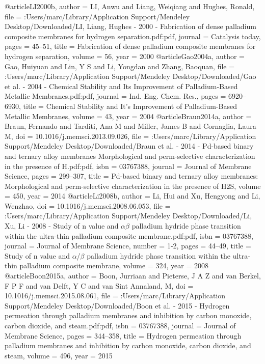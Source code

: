 @article{LI2000b,
author = {LI, Anwu and Liang, Weiqiang and Hughes, Ronald},
file = {:Users/marc/Library/Application Support/Mendeley Desktop/Downloaded/LI, Liang, Hughes - 2000 - Fabrication of dense palladium composite membranes for hydrogen separation.pdf:pdf},
journal = {Catalysis today},
pages = {45--51},
title = {{Fabrication of dense palladium composite membranes for hydrogen separation}},
volume = {56},
year = {2000}
}
@article{Gao2004a,
author = {Gao, Huiyuan and Lin, Y S and Li, Yongdan and Zhang, Baoquan},
file = {:Users/marc/Library/Application Support/Mendeley Desktop/Downloaded/Gao et al. - 2004 - Chemical Stability and Its Improvement of Palladium-Based Metallic Membranes.pdf:pdf},
journal = {Ind. Eng. Chem. Res.},
pages = {6920--6930},
title = {{Chemical Stability and It's Improvement of Palladium-Based Metallic Membranes}},
volume = {43},
year = {2004}
}
@article{Braun2014a,
author = {Braun, Fernando and Tarditi, Ana M and Miller, James B and Cornaglia, Laura M},
doi = {10.1016/j.memsci.2013.09.026},
file = {:Users/marc/Library/Application Support/Mendeley Desktop/Downloaded/Braun et al. - 2014 - Pd-based binary and ternary alloy membranes Morphological and perm-selective characterization in the presence of H.pdf:pdf},
isbn = {03767388},
journal = {Journal of Membrane Science},
pages = {299--307},
title = {{Pd-based binary and ternary alloy membranes: Morphological and perm-selective characterization in the presence of H2S}},
volume = {450},
year = {2014}
}
@article{Li2008b,
author = {Li, Hui and Xu, Hengyong and Li, Wenzhao},
doi = {10.1016/j.memsci.2008.06.053},
file = {:Users/marc/Library/Application Support/Mendeley Desktop/Downloaded/Li, Xu, Li - 2008 - Study of n value and $\alpha$$\beta$ palladium hydride phase transition within the ultra-thin palladium composite membrane.pdf:pdf},
isbn = {03767388},
journal = {Journal of Membrane Science},
number = {1-2},
pages = {44--49},
title = {{Study of n value and $\alpha$/$\beta$ palladium hydride phase transition within the ultra-thin palladium composite membrane}},
volume = {324},
year = {2008}
}
@article{Boon2015a,
author = {Boon, Jurriaan and Pieterse, J A Z and van Berkel, F P F and van Delft, Y C and {van Sint Annaland}, M},
doi = {10.1016/j.memsci.2015.08.061},
file = {:Users/marc/Library/Application Support/Mendeley Desktop/Downloaded/Boon et al. - 2015 - Hydrogen permeation through palladium membranes and inhibition by carbon monoxide, carbon dioxide, and steam.pdf:pdf},
isbn = {03767388},
journal = {Journal of Membrane Science},
pages = {344--358},
title = {{Hydrogen permeation through palladium membranes and inhibition by carbon monoxide, carbon dioxide, and steam}},
volume = {496},
year = {2015}
}
